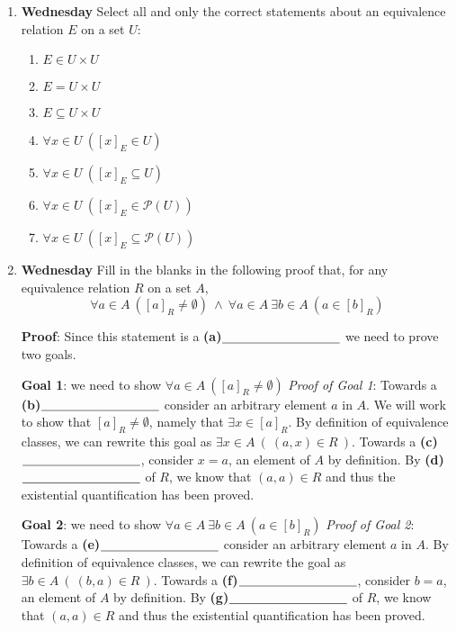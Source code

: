 \documentclass[12pt, oneside]{article}
\begin{document}
\begin{enumerate}
\item {\bf Wednesday} Select all and only the correct statements about an equivalence relation $E$ on 
a set $U$:
\begin{enumerate}
\item $E \in U \times U$
\item $E = U \times U$
\item $E \subseteq U \times U$
\item $\forall x \in U ~([x]_E \in U)$
\item $\forall x \in U ~([x]_E \subseteq U)$
\item $\forall x \in U ~([x]_E \in \mathcal{P}(U))$
\item $\forall x \in U ~([x]_E \subseteq \mathcal{P}(U))$
\end{enumerate}

\newpage
\item {\bf Wednesday} Fill in the blanks in the following proof that, for any equivalence relation $R$ on a set $A$,
\[
\forall a \in A ~([a]_R \neq \emptyset) ~\land ~\forall a \in A ~\exists b \in A~\left( a \in [b]_R \right)
\]

{\bf Proof}: Since this statement is a  \textbf{(a)}$\underline{\phantom{\hspace{1.3in}}}$
we need to prove two goals.

{\bf Goal 1}: we need to show $\forall a \in A ~([a]_R \neq \emptyset) $
{\it Proof of Goal 1}: Towards a \textbf{(b)}$\underline{\phantom{\hspace{1.3in}}}$ 
consider an arbitrary element $a$ in $A$. 
We will work to show that $[a]_R \neq \emptyset$, namely that $\exists x \in [a]_R$.
By definition of equivalence classes, we can rewrite this goal as 
$\exists x \in A ~( ~(a,x) \in R~)$. 
 Towards a \textbf{(c)}$\underline{\phantom{\hspace{1.3in}}}$, consider $x = a$, 
 an element of $A$ by definition. By \textbf{(d)}$\underline{\phantom{\hspace{1.3in}}}$  of $R$, we know that $(a,a) \in R$  and thus the existential quantification has been proved.
 
{\bf Goal 2}: we need to show $\forall a \in A ~\exists b \in A~\left( a \in [b]_R \right)$
{\it Proof of Goal 2}: Towards a \textbf{(e)}$\underline{\phantom{\hspace{1.3in}}}$ 
consider an arbitrary element $a$ in $A$. By definition of equivalence classes, we can rewrite the goal as 
$\exists b \in A ~( ~(b,a) \in R~)$. 
 Towards a \textbf{(f)}$\underline{\phantom{\hspace{1.3in}}}$, consider $b = a$, 
 an element of $A$ by definition. By \textbf{(g)}$\underline{\phantom{\hspace{1.3in}}}$  of $R$, we know that $(a,a) \in R$  and thus the existential quantification has been proved. 
 

\end{enumerate}
\end{document}
